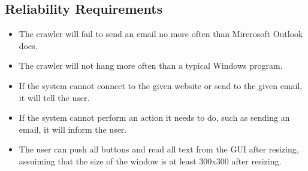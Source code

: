 \subsection{Reliability Requirements}
\begin{itemize}
\item The crawler will fail to send an email no more often than Mircrosoft Outlook does.
\item The crawler will not hang more often than a typical Windows program.
\item If the system cannot connect to the given website or send to the given email, it will tell the user.
\item If the system cannot perform an action it needs to do, such as sending an email, it will inform the user.
\item The user can push all buttons and read all text from the GUI after resizing, assuiming that the size of the window is at least 300x300 after resizing.
\end{itemize}
